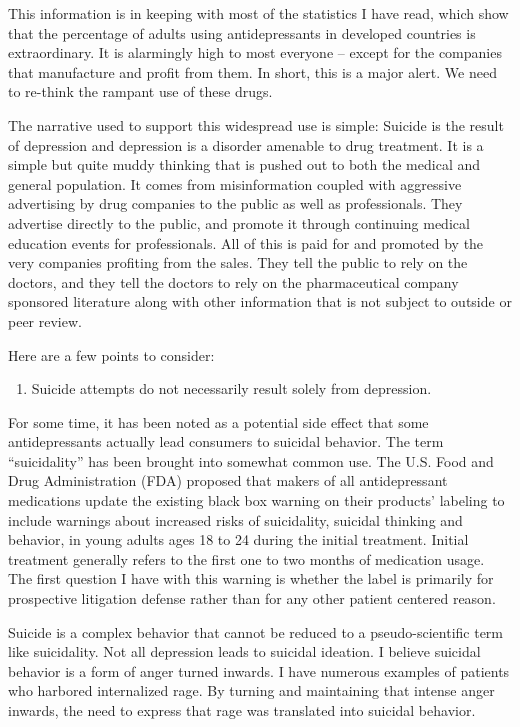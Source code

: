 \documentclass[]{book}
\providecommand{\tightlist}{%
  \setlength{\itemsep}{0pt}\setlength{\parskip}{0pt}}
\begin{document}
This information is in keeping with most of the statistics I have read, which show that the percentage of adults using antidepressants in developed countries is extraordinary. It is alarmingly high to most everyone -- except for the companies that manufacture and profit from them. In short, this is a major alert. We need to re-think the rampant use of these drugs.

The narrative used to support this widespread use is simple: Suicide is the result of depression and depression is a disorder amenable to drug treatment. It is a simple but quite muddy thinking that is pushed out to both the medical and general population. It comes from misinformation coupled with aggressive advertising by drug companies to the public as well as professionals. They advertise directly to the public, and promote it through continuing medical education events for professionals. All of this is paid for and promoted by the very companies profiting from the sales. They tell the public to rely on the doctors, and they tell the doctors to rely on the pharmaceutical company sponsored literature along with other information that is not subject to outside or peer review.

Here are a few points to consider:

\begin{enumerate}
\def\labelenumi{\arabic{enumi}.}
\tightlist
\item
  Suicide attempts do not necessarily result solely from depression.
\end{enumerate}

For some time, it has been noted as a potential side effect that some antidepressants actually lead consumers to suicidal behavior. The term ``suicidality'' has been brought into somewhat common use. The U.S. Food and Drug Administration (FDA) proposed that makers of all antidepressant medications update the existing black box warning on their products' labeling to include warnings about increased risks of suicidality, suicidal thinking and behavior, in young adults ages 18 to 24 during the initial treatment. Initial treatment generally refers to the first one to two months of medication usage. The first question I have with this warning is whether the label is primarily for prospective litigation defense rather than for any other patient centered reason.

Suicide is a complex behavior that cannot be reduced to a pseudo-scientific term like suicidality. Not all depression leads to suicidal ideation. I believe suicidal behavior is a form of anger turned inwards. I have numerous examples of patients who harbored internalized rage. By turning and maintaining that intense anger inwards, the need to express that rage was translated into suicidal behavior.
\end{document}
